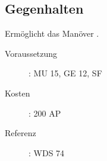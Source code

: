 \subsection{Gegenhalten}
\label{sf.gegenhalten}
Ermöglicht das Manöver .
\begin{description}
    \item[Voraussetzung]:
        MU 15, GE 12, SF 
    \item [Kosten]:
        200 AP
    \item [Referenz]:
        WDS 74
\end{description}
